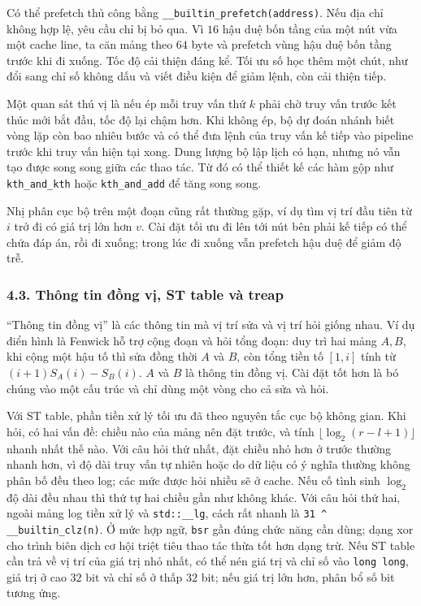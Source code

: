 \documentclass[11pt]{article}
\begin{document}
Có thể prefetch thủ công bằng \texttt{\_\_builtin\_prefetch(address)}. Nếu địa
chỉ không hợp lệ, yêu cầu chỉ bị bỏ qua. Vì \(16\) hậu duệ bốn tầng của một nút
vừa một cache line, ta căn mảng theo \(64\) byte và prefetch vùng hậu duệ bốn
tầng trước khi đi xuống. Tốc độ cải thiện đáng kể. Tối ưu số học thêm một chút,
như đổi sang chỉ số không dấu và viết điều kiện để giảm lệnh, còn cải thiện
tiếp.

Một quan sát thú vị là nếu ép mỗi truy vấn thứ \(k\) phải chờ truy vấn trước
kết thúc mới bắt đầu, tốc độ lại chậm hơn. Khi không ép, bộ dự đoán nhánh biết
vòng lặp còn bao nhiêu bước và có thể đưa lệnh của truy vấn kế tiếp vào
pipeline trước khi truy vấn hiện tại xong. Dung lượng bộ lập lịch có hạn, nhưng
nó vẫn tạo được song song giữa các thao tác. Từ đó có thể thiết kế các hàm gộp
như \texttt{kth\_and\_kth} hoặc \texttt{kth\_and\_add} để tăng song song.

Nhị phân cục bộ trên một đoạn cũng rất thường gặp, ví dụ tìm vị trí đầu tiên
từ \(i\) trở đi có giá trị lớn hơn \(v\). Cài đặt tối ưu đi lên tới nút bên
phải kế tiếp có thể chứa đáp án, rồi đi xuống; trong lúc đi xuống vẫn prefetch
hậu duệ để giảm độ trễ.

\subsubsection*{4.3. Thông tin đồng vị, ST table và treap}

``Thông tin đồng vị'' là các thông tin mà vị trí sửa và vị trí hỏi giống nhau.
Ví dụ điển hình là Fenwick hỗ trợ cộng đoạn và hỏi tổng đoạn: duy trì hai mảng
\(A,B\), khi cộng một hậu tố thì sửa đồng thời \(A\) và \(B\), còn tổng tiền tố
\([1,i]\) tính từ \((i+1)S_A(i)-S_B(i)\). \(A\) và \(B\) là thông tin đồng vị.
Cài đặt tốt hơn là bó chúng vào một cấu trúc và chỉ dùng một vòng cho cả sửa và
hỏi.

Với ST table, phần tiền xử lý tối ưu đã theo nguyên tắc cục bộ không gian. Khi
hỏi, có hai vấn đề: chiều nào của mảng nên đặt trước, và tính
\(\lfloor\log_2(r-l+1)\rfloor\) nhanh nhất thế nào. Với câu hỏi thứ nhất, đặt
chiều nhỏ hơn ở trước thường nhanh hơn, vì độ dài truy vấn tự nhiên hoặc do dữ
liệu có ý nghĩa thường không phân bố đều theo log; các mức được hỏi nhiều sẽ ở
cache. Nếu cố tình sinh \(\log_2\) độ dài đều nhau thì thứ tự hai chiều gần như
không khác. Với câu hỏi thứ hai, ngoài mảng log tiền xử lý và \texttt{std::\_\_lg},
cách rất nhanh là \texttt{31 \^{} \_\_builtin\_clz(n)}. Ở mức hợp ngữ,
\texttt{bsr} gần đúng chức năng cần dùng; dạng xor cho trình biên dịch cơ hội
triệt tiêu thao tác thừa tốt hơn dạng trừ. Nếu ST table cần trả về vị trí của
giá trị nhỏ nhất, có thể nén giá trị và chỉ số vào \texttt{long long}, giá trị
ở cao \(32\) bit và chỉ số ở thấp \(32\) bit; nếu giá trị lớn hơn, phân bổ số
bit tương ứng.
\end{document}
